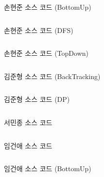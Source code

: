 \begin{frame}{손현준 소스 코드 (BottomUp)}
\inputminted{java}{../src/\prob/hyunjoon/P14585_BottomUp.java}
\end{frame}

\begin{frame}{손현준 소스 코드 (DFS)}
\inputminted{java}{../src/\prob/hyunjoon/P14585_DFS.java}
\end{frame}

\begin{frame}{손현준 소스 코드 (TopDown)}
\inputminted{java}{../src/\prob/hyunjoon/P14585_TopDown.java}
\end{frame}

\begin{frame}{김준형 소스 코드 (BackTracking)}
\inputminted{java}{../src/\prob/joonhyeong/Main_BackTracking.java}
\end{frame}

\begin{frame}{김준형 소스 코드 (DP)}
\inputminted{java}{../src/\prob/joonhyeong/Main_DP.java}
\end{frame}

\begin{frame}{서민종 소스 코드}
\inputminted{java}{../src/\prob/minjong/Main.java}
\end{frame}

\begin{frame}{임건애 소스 코드}
\inputminted{java}{../src/\prob/geonae/b14585.java}
\end{frame}

\begin{frame}{임건애 소스 코드 (BottomUp)}
\inputminted{java}{../src/\prob/geonae/b14585_bottom.java}
\end{frame}
